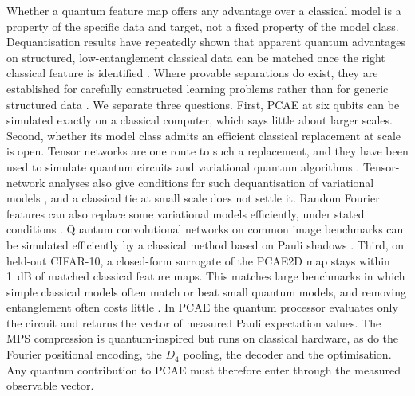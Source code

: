 \documentclass[pdflatex,sn-basic]{sn-jnl}
\begin{document}
Whether a quantum feature map offers any advantage over a classical model is a property of the specific data and target, not a fixed property of the model class.
Dequantisation results have repeatedly shown that apparent quantum advantages on structured, low-entanglement classical data can be matched once the right classical feature is identified \citep{Huang2021PowerData, Tang2019}.
Where provable separations do exist, they are established for carefully constructed learning problems rather than for generic structured data \citep{Gyurik2023}.
We separate three questions.
First, PCAE at six qubits can be simulated exactly on a classical computer, which says little about larger scales.
Second, whether its model class admits an efficient classical replacement at scale is open.
Tensor networks are one route to such a replacement, and they have been used to simulate quantum circuits \citep{Patra2024IBM, Patra2025PEPS} and variational quantum algorithms \citep{Aizpurua2025}.
Tensor-network analyses also give conditions for such dequantisation of variational models \citep{Shin2024Dequant}, and a classical tie at small scale does not settle it.
Random Fourier features can also replace some variational models efficiently, under stated conditions \citep{Sweke2025}.
Quantum convolutional networks on common image benchmarks can be simulated efficiently by a classical method based on Pauli shadows \citep{Bermejo2026}.
Third, on held-out CIFAR-10, a closed-form surrogate of the PCAE2D map stays within 1~dB of matched classical feature maps.
This matches large benchmarks in which simple classical models often match or beat small quantum models, and removing entanglement often costs little \citep{Bowles2024}.
In PCAE the quantum processor evaluates only the circuit and returns the vector of measured Pauli expectation values.
The MPS compression is quantum-inspired but runs on classical hardware, as do the Fourier positional encoding, the $D_4$ pooling, the decoder and the optimisation.
Any quantum contribution to PCAE must therefore enter through the measured observable vector.
\end{document}
